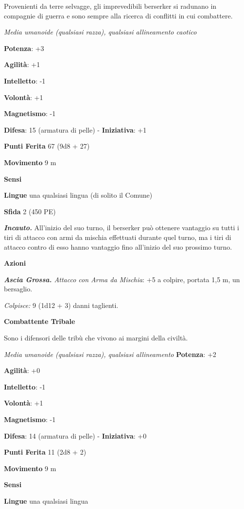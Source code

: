 \begin{multicols}{2}
Provenienti da terre selvagge, gli imprevedibili berserker si radunano
in compagnie di guerra e sono sempre alla ricerca di conflitti in cui
combattere.

\emph{Media umanoide (qualsiasi razza), qualsiasi allineamento caotico}

\textbf{Potenza}: +3

\textbf{Agilità}: +1

\textbf{Intelletto}: -1

\textbf{Volontà}: +1

\textbf{Magnetismo}: -1

\textbf{Difesa}: 15 (armatura di pelle) - \textbf{Iniziativa}: +1

\textbf{Punti Ferita} 67 (9d8 + 27)

\textbf{Movimento} 9 m

\textbf{Sensi} 

\textbf{Lingue} una qualsiasi lingua (di solito il Comune)

\textbf{Sfida} 2 (450 PE)

\emph{\textbf{Incauto.}} All'inizio del suo turno, il berserker può
ottenere vantaggio su tutti i tiri di attacco con armi da mischia
effettuati durante quel turno, ma i tiri di attacco contro di esso hanno
vantaggio fino all'inizio del suo prossimo turno.

\textbf{Azioni}

\emph{\textbf{Ascia Grossa.} Attacco con Arma da Mischia}: +5 a colpire,
portata 1,5 m, un bersaglio.

\emph{Colpisce:} 9 (1d12 + 3) danni taglienti.

\textbf{Combattente Tribale}

Sono i difensori delle tribù che vivono ai margini della civiltà.

\emph{Media umanoide (qualsiasi razza), qualsiasi allineamento}
\textbf{Potenza}: +2

\textbf{Agilità}: +0

\textbf{Intelletto}: -1

\textbf{Volontà}: +1

\textbf{Magnetismo}: -1

\textbf{Difesa}: 14 (armatura di pelle) - \textbf{Iniziativa}: +0

\textbf{Punti Ferita} 11 (2d8 + 2)

\textbf{Movimento} 9 m

\textbf{Sensi} 

\textbf{Lingue} una qualsiasi lingua


\end{multicols}

